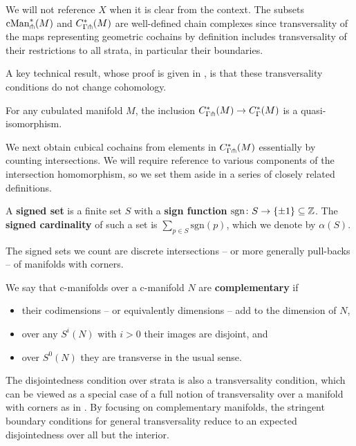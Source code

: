 We will not reference $X$ when it is clear from the context.
The subsets $\mathrm{cMan}_\pitchfork^*(M)$ and $C^*_{\Gamma \pitchfork}(M)$ are well-defined chain complexes since transversality of the maps representing geometric cochains by definition includes transversality of their restrictions to all strata, in particular their boundaries.

A key technical result, whose proof is given in \cite{medina2022foundations},
is that these transversality conditions do not change cohomology.

\begin{theorem}\label{T: transverse complex}
	For any cubulated manifold $M$, the inclusion $C^*_{\Gamma \pitchfork}(M) \to C^*_\Gamma(M)$ is a quasi-isomorphism.
\end{theorem}

We next obtain cubical cochains from elements in $C^*_{\Gamma \pitchfork}(M)$ essentially by counting intersections.
We will require reference to various components of the intersection homomorphism, so we set them aside in a series of closely related definitions.

\begin{definition}
	A \textbf{signed set} is a finite set $S$ with a \textbf{sign function} $\mathrm{sgn} \colon S \to \{\pm 1\} \subseteq \mathbb{Z}$.
	The \textbf{signed cardinality} of such a set is $\sum_{p \in S} \mathrm{sgn}(p)$, which we denote by $\alpha(S)$.
\end{definition}

The signed sets we count are discrete intersections -- or more generally pull-backs -- of manifolds with corners.

\begin{definition}
	We say that c-manifolds over a c-manifold $N$ are \textbf{complementary} if

	\begin{itemize}
		\item their codimensions -- or equivalently dimensions --
		add to the dimension of $N$,

		\item over any $S^i(N)$ with $i>0$ their images are disjoint, and

		\item over $S^0(N)$ they are transverse in the usual sense.
	\end{itemize}
\end{definition}

The disjointedness condition over strata is also a transversality condition, which can be viewed as a special case of a full notion of transversality over a manifold with corners as in \cite{Joy12}.
By focusing on complementary manifolds, the stringent boundary conditions for general transversality reduce to an expected disjointedness over all but the interior.

